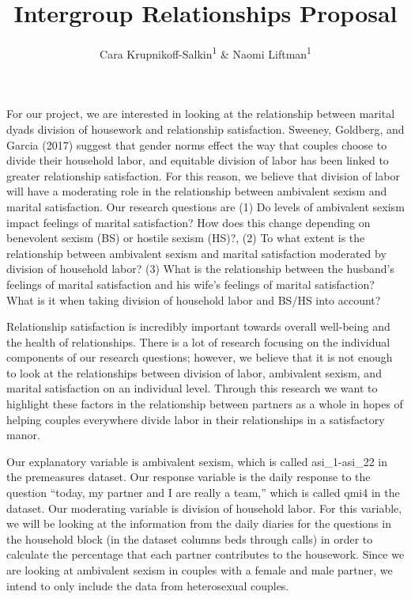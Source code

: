 \documentclass[
  english,
  man]{apa6}
\title{Intergroup Relationships Proposal}
\author{Cara Krupnikoff-Salkin\textsuperscript{1} \& Naomi Liftman\textsuperscript{1}}
\date{}
\affiliation{\vspace{0.5cm}\textsuperscript{1} Smith College}
\begin{document}
\maketitle

For our project, we are interested in looking at the relationship between marital dyads division of housework and relationship satisfaction. Sweeney, Goldberg, and Garcia (2017) suggest that gender norms effect the way that couples choose to divide their household labor, and equitable division of labor has been linked to greater relationship satisfaction. For this reason, we believe that division of labor will have a moderating role in the relationship between ambivalent sexism and marital satisfaction. Our research questions are (1) Do levels of ambivalent sexism impact feelings of marital satisfaction? How does this change depending on benevolent sexism (BS) or hostile sexism (HS)?, (2) To what extent is the relationship between ambivalent sexism and marital satisfaction moderated by division of household labor? (3) What is the relationship between the husband's feelings of marital satisfaction and his wife's feelings of marital satisfaction? What is it when taking division of household labor and BS/HS into account?

Relationship satisfaction is incredibly important towards overall well-being and the health of relationships. There is a lot of research focusing on the individual components of our research questions; however, we believe that it is not enough to look at the relationships between division of labor, ambivalent sexism, and marital satisfaction on an individual level. Through this research we want to highlight these factors in the relationship between partners as a whole in hopes of helping couples everywhere divide labor in their relationships in a satisfactory manor.

Our explanatory variable is ambivalent sexism, which is called asi\_1-asi\_22 in the premeasures dataset. Our response variable is the daily response to the question \enquote{today, my partner and I are really a team,} which is called qmi4 in the dataset. Our moderating variable is division of household labor. For this variable, we will be looking at the information from the daily diaries for the questions in the household block (in the dataset columns beds through calls) in order to calculate the percentage that each partner contributes to the housework. Since we are looking at ambivalent sexism in couples with a female and male partner, we intend to only include the data from heterosexual couples.
\end{document}
